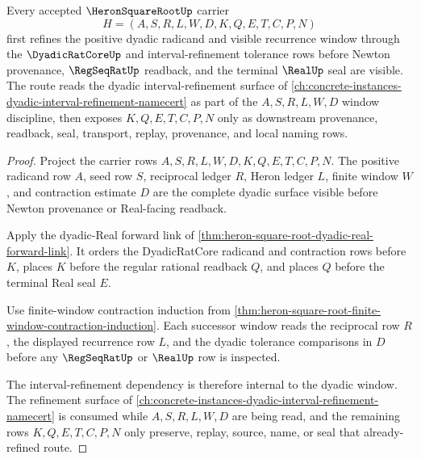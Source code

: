 \begin{theorem}
\label{thm:heron-square-root-dyadic-refinement-route}
Every accepted $\HeronSquareRootUp$ carrier
$$
H=(A,S,R,L,W,D,K,Q,E,T,C,P,N)
$$
first refines the positive dyadic radicand and visible recurrence window through the $\DyadicRatCoreUp$ and interval-refinement tolerance rows before Newton provenance, $\RegSeqRatUp$ readback, and the terminal $\RealUp$ seal are visible. The route reads the dyadic interval-refinement surface of \autoref{ch:concrete-instances-dyadic-interval-refinement-namecert} as part of the $A,S,R,L,W,D$ window discipline, then exposes $K,Q,E,T,C,P,N$ only as downstream provenance, readback, seal, transport, replay, provenance, and local naming rows.
\end{theorem}
\begin{proof}
Project the carrier rows $A,S,R,L,W,D,K,Q,E,T,C,P,N$. The positive radicand row $A$, seed row $S$, reciprocal ledger $R$, Heron ledger $L$, finite window $W$, and contraction estimate $D$ are the complete dyadic surface visible before Newton provenance or Real-facing readback.

Apply the dyadic-Real forward link of \autoref{thm:heron-square-root-dyadic-real-forward-link}. It orders the DyadicRatCore radicand and contraction rows before $K$, places $K$ before the regular rational readback $Q$, and places $Q$ before the terminal Real seal $E$.

Use finite-window contraction induction from \autoref{thm:heron-square-root-finite-window-contraction-induction}. Each successor window reads the reciprocal row $R$, the displayed recurrence row $L$, and the dyadic tolerance comparisons in $D$ before any $\RegSeqRatUp$ or $\RealUp$ row is inspected.

The interval-refinement dependency is therefore internal to the dyadic window. The refinement surface of \autoref{ch:concrete-instances-dyadic-interval-refinement-namecert} is consumed while $A,S,R,L,W,D$ are being read, and the remaining rows $K,Q,E,T,C,P,N$ only preserve, replay, source, name, or seal that already-refined route.
\end{proof}

